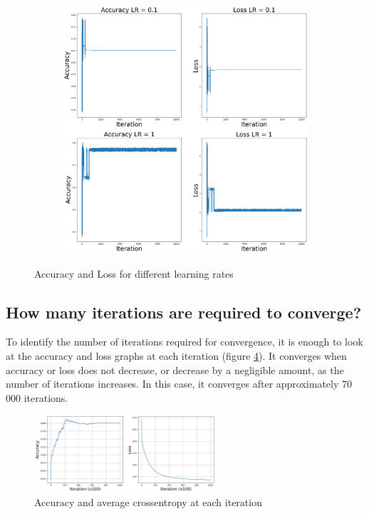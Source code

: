 \documentclass{article}
\begin{document}
\begin{figure}[h]
\begin{subfigure}{0.3\linewidth}
    \label{fig:image2}
  \end{subfigure}
  \begin{subfigure}{0.3\linewidth}
    \centering
    \includegraphics[width=\linewidth]{images/learning_rates_3.png}
    \label{fig:image3}
  \end{subfigure}
  \caption{Accuracy and Loss for different learning rates}
  \label{fig:three_images}
\end{figure}
\subsection{How many iterations are required to converge?}
To identify the number of iterations required for convergence,
it is enough to look at the accuracy and loss graphs at each iteration (figure \ref{fig:train_acc_loss}).
It converges when accuracy or loss does not decrease, or decrease by a negligible amount, as the number of iterations increases.
In this case, it converges after approximately 70 000 iterations.



\begin{figure}[h]
  \centering
  \includegraphics[width=0.6\textwidth]{images/Train_graphs.png}
  \caption{Accuracy and average crossentropy at each iteration}
  \label{fig:train_acc_loss}

\end{figure}
\end{document}
